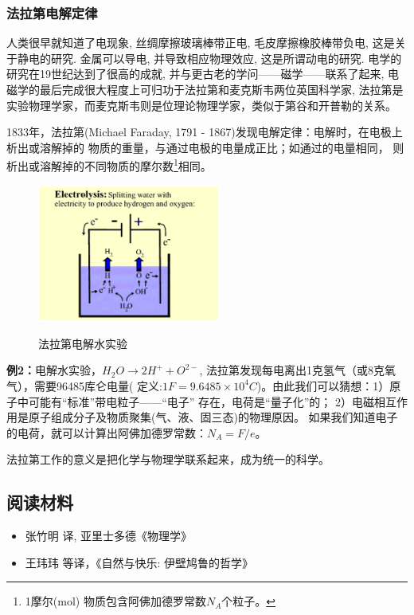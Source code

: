 \subsubsection{法拉第电解定律}


人类很早就知道了电现象, 丝绸摩擦玻璃棒带正电, 毛皮摩擦橡胶棒带负电,
这是关于静电的研究. 金属可以导电, 并导致相应物理效应,
这是所谓动电的研究. 电学的研究在19世纪达到了很高的成就,
并与更古老的学问——磁学——联系了起来,
电磁学的最后完成很大程度上可归功于法拉第和麦克斯韦两位英国科学家,
法拉第是实验物理学家，而麦克斯韦则是位理论物理学家，类似于第谷和开普勒的关系。

1833年，法拉第(Michael Faraday, 1791 -
1867)发现电解定律：电解时，在电极上析出或溶解掉的
物质的重量，与通过电极的电量成正比；如通过的电量相同，
则析出或溶解掉的不同物质的摩尔数\footnote{1摩尔(mol)
物质包含阿佛加德罗常数$N_A$个粒子。}相同。


\begin{figure}[h]
\begin{center}
  \includegraphics[width=6cm]{AtomIdea/faradaylaw.ps}\\
  \caption{法拉第电解水实验}
\end{center}
\end{figure}



{\bf 例2：}电解水实验，$H_2 O \rightarrow 2H^ +   + O^{2 - } $,
法拉第发现每电离出1克氢气（或8克氧气），需要96485库仑电量( 定义:$1F
= 9.6485 \times 10^4
C$)。由此我们可以猜想：1）原子中可能有“标准”带电粒子——“电子”
存在，电荷是“量子化”的；
2）电磁相互作用是原子组成分子及物质聚集(气、液、固三态)的物理原因。
如果我们知道电子的电荷，就可以计算出阿佛加德罗常数：$N_A  = F/e$。

法拉第工作的意义是把化学与物理学联系起来，成为统一的科学。


\subsection*{阅读材料}

\begin{itemize}
  \item 张竹明 译, 亚里士多德《物理学》
  
  \item 王玮玮
等译，《自然与快乐: 伊壁鸠鲁的哲学》

\end{itemize}
